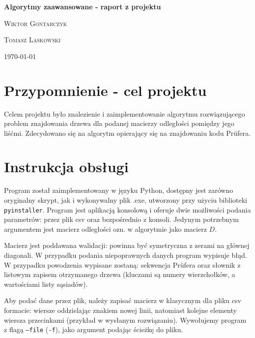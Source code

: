 \documentclass[a4paper,12p]{article}
\begin{document}
\begin{titlepage}
	\begin{center}
	
	{\huge\bfseries Algorytmy zaawansowane - raport z projektu} \\
	\vspace{1cm}
	{\Large\scshape Wiktor Gontarczyk\par}
	{\Large\scshape Tomasz Laskowski\par}
	\vspace{2cm}

	\today
	\vspace{1cm}	
	
	\end{center}
\end{titlepage}

\section{Przypomnienie - cel projektu}

Celem projektu było znalezienie i zaimplementowanie algorytmu rozwiązującego problem znajdowania drzewa dla podanej macierzy odległości pomiędzy jego liśćmi. Zdecydowano się na algorytm opierający się na znajdowaniu kodu Prüfera.

\section{Instrukcja obsługi}

Program został zaimplementowany w języku Python, dostępny jest zarówno oryginalny skrypt, jak i wykonywalny plik .exe, utworzony przy użyciu biblioteki \texttt{pyinstaller}. Program jest aplikacją konsolową i oferuje dwie możliwości podania parametrów: przez plik csv oraz bezpośrednio z konsoli. Jedynym potrzebnym argumentem jest macierz odległości ozn. w algorytmie jako macierz $D$.

Macierz jest poddawana walidacji: powinna być symetryczna z zerami na głównej diagonali. W przypadku podania niepoprawnych danych program wypisuje błąd. W przypadku powodzenia wypisane zostaną: sekwencja Prüfera oraz słownik z listowym zapisem otrzymanego drzewa (kluczami są numery wierzchołków, a wartościami listy sąsiadów).

Aby podać dane przez plik, należy zapisać macierz w klasycznym dla pliku csv formacie: wiersze oddzielając znakiem nowej linii, natomiast kolejne elementy wiersza przecinkami (przykład w wysłanym rozwiązaniu). Wywołujemy program z flagą \texttt{--file} (\texttt{-f}), jako argument podając ścieżkę do pliku.
\end{document}
